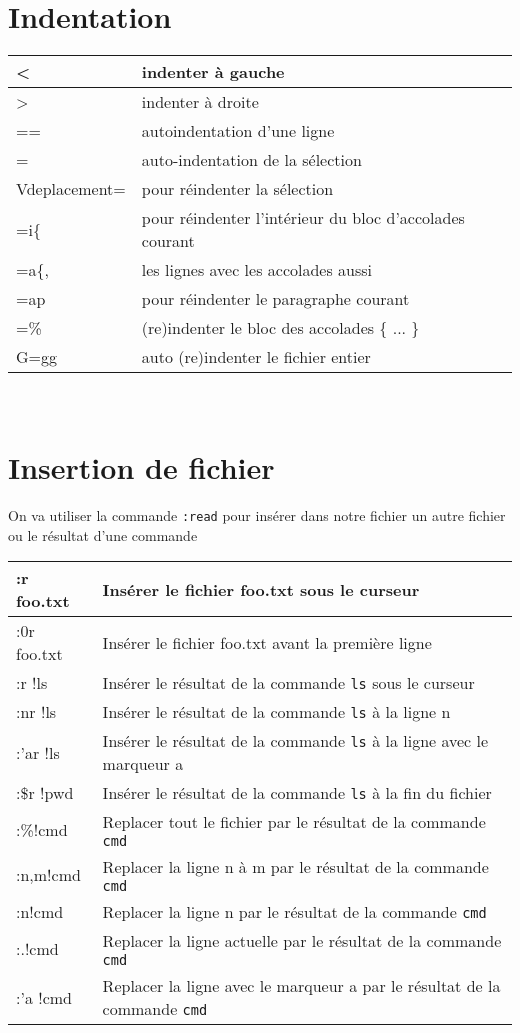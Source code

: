\documentclass{article}
\begin{document}
\section{Indentation}
\begin{tabular}{|p{3cm}| l| }
\hline
< & indenter à gauche\\ \hline
> & indenter à droite\\ \hline
== & autoindentation d'une ligne\\ \hline
= & auto-indentation de la sélection\\ \hline
V{deplacement}= & pour réindenter la sélection\\ \hline
=i\{ & pour réindenter l'intérieur du bloc d'accolades courant\\ \hline
=a\{, & les lignes avec les accolades aussi\\ \hline
=ap & pour réindenter le paragraphe courant\\ \hline
=\% & (re)indenter le bloc des accolades \{ ... \} \\ \hline
G=gg   & auto (re)indenter le fichier entier \\ \hline
\end{tabular}\\

\section{Insertion de fichier}
On va utiliser la commande \verb?:read? pour insérer dans notre fichier un autre fichier ou le résultat d'une commande\\


\begin{tabular}{|p{3cm}| l| }
\hline
:r foo.txt & Insérer le fichier foo.txt sous le curseur \\ \hline
:0r foo.txt & Insérer le fichier foo.txt avant la première ligne \\ \hline
:r !ls & Insérer le résultat de la commande \verb?ls?  sous le curseur \\ \hline
:nr !ls & Insérer le résultat de la commande \verb?ls? à la ligne n \\ \hline
:'ar !ls & Insérer le résultat de la commande \verb?ls? à la ligne avec le marqueur a \\ \hline
:\$r !pwd & Insérer le résultat de la commande \verb?ls? à la fin du fichier  \\ \hline
:\%!cmd & Replacer tout le fichier par le résultat de la commande \verb?cmd? \\ \hline
:n,m!cmd & Replacer la ligne n à m par le résultat de la commande \verb?cmd? \\ \hline
:n!cmd & Replacer la ligne n par le résultat de la commande \verb?cmd? \\ \hline
:.!cmd & Replacer la ligne actuelle par le résultat de la commande \verb?cmd?\\ \hline
:'a !cmd & Replacer la ligne avec le marqueur a par le résultat de la commande \verb?cmd? \\ \hline
\end{tabular}\\
\end{document}
